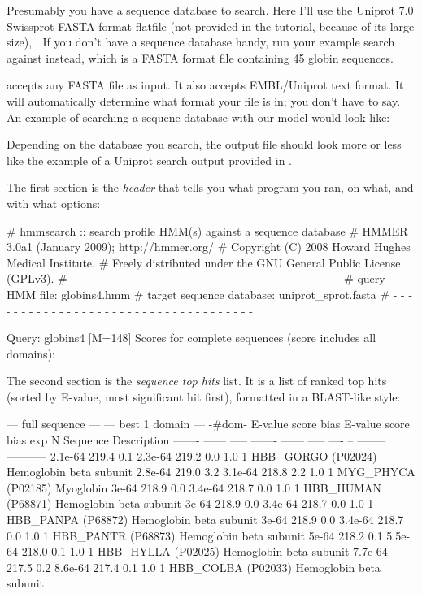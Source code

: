 Presumably you have a sequence database to search. Here I'll use the
Uniprot 7.0 Swissprot FASTA format flatfile (not provided in the
tutorial, because of its large size), .  If
you don't have a sequence database handy, run your example search
against  instead, which is a FASTA format
file containing 45 globin sequences.

 accepts any FASTA file as input. It also accepts
EMBL/Uniprot text format. It will automatically determine what format
your file is in; you don't have to say. An example of searching a
sequene database with our  model would look like:


Depending on the database you search, the output file
 should look more or less like the example of a
Uniprot search output provided in .

The first section is the \emph{header} that tells you what program you
ran, on what, and with what options:

\begin{sreoutput}
# hmmsearch :: search profile HMM(s) against a sequence database
# HMMER 3.0a1 (January 2009); http://hmmer.org/
# Copyright (C) 2008 Howard Hughes Medical Institute.
# Freely distributed under the GNU General Public License (GPLv3).
# - - - - - - - - - - - - - - - - - - - - - - - - - - - - - - - - - - - -
# query HMM file:                  globins4.hmm
# target sequence database:        uniprot_sprot.fasta
# - - - - - - - - - - - - - - - - - - - - - - - - - - - - - - - - - - - -

Query:       globins4  [M=148]
Scores for complete sequences (score includes all domains):
\end{sreoutput}

The second section is the \emph{ sequence top hits} list. It is a list
of ranked top hits (sorted by E-value, most significant hit first),
formatted in a BLAST-like style:

\begin{sreoutput}
 --- full sequence ---   --- best 1 domain ---    -#dom-
  E-value  score  bias    E-value  score  bias    exp  N  Sequence    Description
  ------- ------ -----    ------- ------ -----   ---- --  --------    -----------
  2.1e-64  219.4   0.1    2.3e-64  219.2   0.0    1.0  1  HBB_GORGO   (P02024) Hemoglobin beta subunit
  2.8e-64  219.0   3.2    3.1e-64  218.8   2.2    1.0  1  MYG_PHYCA   (P02185) Myoglobin
    3e-64  218.9   0.0    3.4e-64  218.7   0.0    1.0  1  HBB_HUMAN   (P68871) Hemoglobin beta subunit
    3e-64  218.9   0.0    3.4e-64  218.7   0.0    1.0  1  HBB_PANPA   (P68872) Hemoglobin beta subunit
    3e-64  218.9   0.0    3.4e-64  218.7   0.0    1.0  1  HBB_PANTR   (P68873) Hemoglobin beta subunit
    5e-64  218.2   0.1    5.5e-64  218.0   0.1    1.0  1  HBB_HYLLA   (P02025) Hemoglobin beta subunit
  7.7e-64  217.5   0.2    8.6e-64  217.4   0.1    1.0  1  HBB_COLBA   (P02033) Hemoglobin beta subunit
\end{sreoutput}

